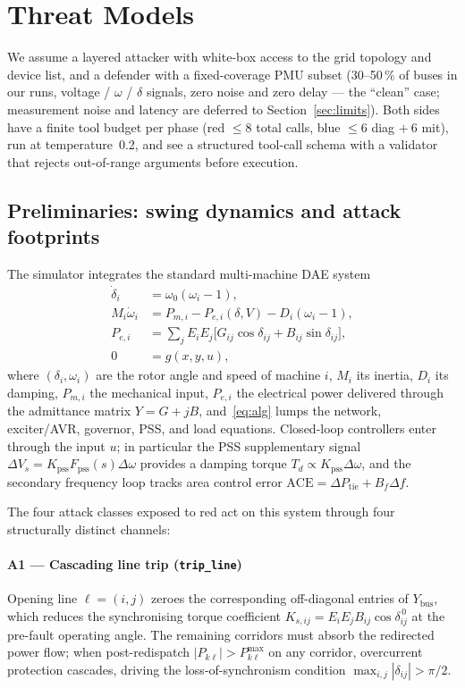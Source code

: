 \documentclass[journal,twocolumn,10pt]{IEEEtran}
\begin{document}
\section{Threat Models}
\label{sec:threat}

We assume a layered attacker with white-box access to the grid topology and device list, and a defender with a fixed-coverage PMU subset (30--50\,\% of buses in our runs, voltage / $\omega$ / $\delta$ signals, zero noise and zero delay --- the ``clean'' case; measurement noise and latency are deferred to Section~\ref{sec:limits}). Both sides have a finite tool budget per phase (red $\leq 8$ total calls, blue $\leq 6$ diag $+\ 6$ mit), run at temperature~0.2, and see a structured tool-call schema with a validator that rejects out-of-range arguments before execution.

\subsection{Preliminaries: swing dynamics and attack footprints}
\label{sec:prelim}
The simulator integrates the standard multi-machine DAE system
\begin{align}
  \dot{\delta}_i &= \omega_0 (\omega_i - 1), \label{eq:delta}\\
  M_i \dot{\omega}_i &= P_{m,i} - P_{e,i}(\delta, V) - D_i (\omega_i - 1), \label{eq:swing}\\
  P_{e,i} &= \sum_{j} E_i E_j \bigl[ G_{ij}\cos\delta_{ij} + B_{ij}\sin\delta_{ij} \bigr], \label{eq:pe}\\
  0 &= g(x, y, u), \label{eq:alg}
\end{align}
where $(\delta_i, \omega_i)$ are the rotor angle and speed of machine $i$, $M_i$ its inertia, $D_i$ its damping, $P_{m,i}$ the mechanical input, $P_{e,i}$ the electrical power delivered through the admittance matrix $Y = G + jB$, and~\eqref{eq:alg} lumps the network, exciter/AVR, governor, PSS, and load equations. Closed-loop controllers enter through the input $u$; in particular the PSS supplementary signal $\Delta V_s = K_\text{pss} F_\text{pss}(s) \Delta\omega$ provides a damping torque $T_d \propto K_\text{pss} \Delta\omega$, and the secondary frequency loop tracks area control error $\mathrm{ACE} = \Delta P_\text{tie} + B_f \Delta f$.

The four attack classes exposed to red act on this system through four structurally distinct channels:

\paragraph{A1 --- Cascading line trip (\texttt{trip\_line})} Opening line $\ell = (i,j)$ zeroes the corresponding off-diagonal entries of $Y_\text{bus}$, which reduces the synchronising torque coefficient $K_{s,ij} = E_i E_j B_{ij}\cos\delta_{ij}^{\,0}$ at the pre-fault operating angle. The remaining corridors must absorb the redirected power flow; when post-redispatch $|P_{k\ell}| > P_{k\ell}^{\max}$ on any corridor, overcurrent protection cascades, driving the loss-of-synchronism condition $\max_{i,j} |\delta_{ij}| > \pi/2$.
\end{document}

